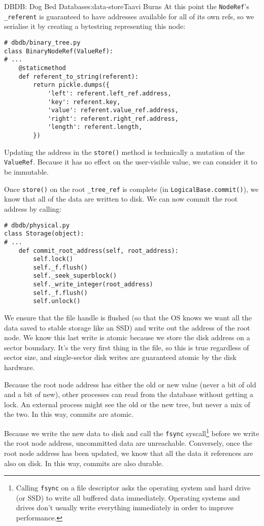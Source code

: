 \begin{aosachapter}{DBDB: Dog Bed Database}{s:data-store}{Taavi Burns}
At this point the \texttt{NodeRef}'s \texttt{\_referent} is guaranteed
to have addresses available for all of its own refs, so we serialise it
by creating a bytestring representing this node:

\begin{verbatim}
# dbdb/binary_tree.py
class BinaryNodeRef(ValueRef):
# ...
    @staticmethod
    def referent_to_string(referent):
        return pickle.dumps({
            'left': referent.left_ref.address,
            'key': referent.key,
            'value': referent.value_ref.address,
            'right': referent.right_ref.address,
            'length': referent.length,
        })
\end{verbatim}

Updating the address in the \texttt{store()} method is technically a
mutation of the \texttt{ValueRef}. Because it has no effect on the
user-visible value, we can consider it to be immutable.

Once \texttt{store()} on the root \texttt{\_tree\_ref} is complete (in
\texttt{LogicalBase.commit()}), we know that all of the data are written
to disk. We can now commit the root address by calling:

\begin{verbatim}
# dbdb/physical.py
class Storage(object):
# ...
    def commit_root_address(self, root_address):
        self.lock()
        self._f.flush()
        self._seek_superblock()
        self._write_integer(root_address)
        self._f.flush()
        self.unlock()
\end{verbatim}

We ensure that the file handle is flushed (so that the OS knows we want
all the data saved to stable storage like an SSD) and write out the
address of the root node. We know this last write is atomic because we
store the disk address on a sector boundary. It's the very first thing
in the file, so this is true regardless of sector size, and
single-sector disk writes are guaranteed atomic by the disk hardware.

Because the root node address has either the old or new value (never a
bit of old and a bit of new), other processes can read from the database
without getting a lock. An external process might see the old or the new
tree, but never a mix of the two. In this way, commits are atomic.

Because we write the new data to disk and call the \texttt{fsync}
syscall\footnote{Calling \texttt{fsync} on a file descriptor asks the
  operating system and hard drive (or SSD) to write all buffered data
  immediately. Operating systems and drives don't usually write
  everything immediately in order to improve performance.} before we
write the root node address, uncommitted data are unreachable.
Conversely, once the root node address has been updated, we know that
all the data it references are also on disk. In this way, commits are
also durable.


\end{aosachapter}
